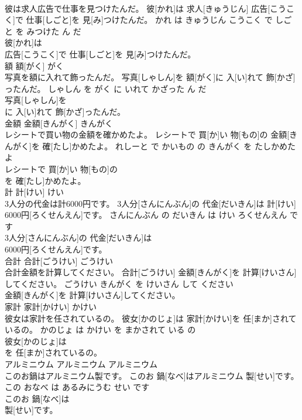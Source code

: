 \documentclass[8pt]{extreport}
\begin{document}
\begin{CJK}{UTF8}{min}
\\	彼は求人広告で仕事を見つけたんだ。	彼[かれ]は 求人[きゅうじん] 広告[こうこく]で 仕事[しごと]を 見[み]つけたんだ。	かれ は きゅうじん こうこく で しごと を みつけた ん だ	
\\	彼[かれ]は
\\	広告[こうこく]で 仕事[しごと]を 見[み]つけたんだ。			
\\	額	額[がく]	がく	
\\	写真を額に入れて飾ったんだ。	写真[しゃしん]を 額[がく]に 入[い]れて 飾[かざ]ったんだ。	しゃしん を がく に いれて かざった ん だ	
\\	写真[しゃしん]を
\\	に 入[い]れて 飾[かざ]ったんだ。			
\\	金額	金額[きんがく]	きんがく	
\\	レシートで買い物の金額を確かめたよ。	レシートで 買[か]い 物[もの]の 金額[きんがく]を 確[たし]かめたよ。	れしーと で かいもの の きんがく を たしかめた よ	
\\	レシートで 買[か]い 物[もの]の
\\	を 確[たし]かめたよ。			
\\	計	計[けい]	けい	
\\	3人分の代金は計6000円です。	3人分[さんにんぶん]の 代金[だいきん]は 計[けい] 6000円[ろくせんえん]です。	さんにんぶん の だいきん は けい ろくせんえん です	
\\	3人分[さんにんぶん]の 代金[だいきん]は
\\	6000円[ろくせんえん]です。			
\\	合計	合計[ごうけい]	ごうけい	
\\	合計金額を計算してください。	合計[ごうけい] 金額[きんがく]を 計算[けいさん]してください。	ごうけい きんがく を けいさん して ください	
\\	金額[きんがく]を 計算[けいさん]してください。			
\\	家計	家計[かけい]	かけい	
\\	彼女は家計を任されているの。	彼女[かのじょ]は 家計[かけい]を 任[まか]されているの。	かのじょ は かけい を まかされて いる の	
\\	彼女[かのじょ]は
\\	を 任[まか]されているの。			
\\	アルミニウム	アルミニウム	アルミニウム	
\\	このお鍋はアルミニウム製です。	このお 鍋[なべ]はアルミニウム 製[せい]です。	この おなべ は あるみにうむ せい です	
\\	このお 鍋[なべ]は
\\	製[せい]です。			

\end{CJK}
\end{document}
